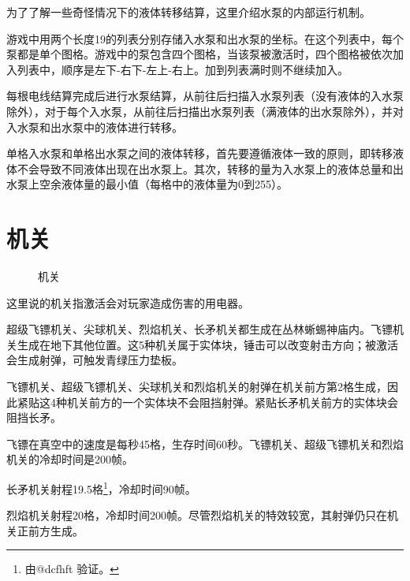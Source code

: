 为了了解一些奇怪情况下的液体转移结算，这里介绍水泵的内部运行机制。

游戏中用两个长度19的列表分别存储入水泵和出水泵的坐标。在这个列表中，每个泵都是单个图格。游戏中的泵包含四个图格，当该泵被激活时，四个图格被依次加入列表中，顺序是左下-右下-左上-右上。加到列表满时则不继续加入。

每根电线结算完成后进行水泵结算，从前往后扫描入水泵列表（没有液体的入水泵除外），对于每个入水泵，从前往后扫描出水泵列表（满液体的出水泵除外），并对入水泵和出水泵中的液体进行转移。

单格入水泵和单格出水泵之间的液体转移，首先要遵循液体一致的原则，即转移液体不会导致不同液体出现在出水泵上。其次，转移的量为入水泵上的液体总量和出水泵上空余液体量的最小值（每格中的液体量为0到255）。

\section{机关}
\begin{figure}[!ht]
\centering
{}\qquad
{}\qquad
{}\qquad
{}\qquad
{}\qquad
{}\qquad
{}\qquad
{}
\caption{机关}
\end{figure}
这里说的机关指激活会对玩家造成伤害的用电器。

超级飞镖机关、尖球机关、烈焰机关、长矛机关都生成在丛林蜥蜴神庙内。飞镖机关生成在地下其他位置。这5种机关属于实体块，锤击可以改变射击方向；被激活会生成射弹，可触发青绿压力垫板。

飞镖机关、超级飞镖机关、尖球机关和烈焰机关的射弹在机关前方第2格生成，因此紧贴这4种机关前方的一个实体块不会阻挡射弹。紧贴长矛机关前方的实体块会阻挡长矛。

飞镖在真空中的速度是每秒45格，生存时间60秒。飞镖机关、超级飞镖机关和烈焰机关的冷却时间是200帧。

长矛机关射程19.5格\footnote{由@dcfhft 验证。}，冷却时间90帧。

烈焰机关射程20格，冷却时间200帧。尽管烈焰机关的特效较宽，其射弹仍只在机关正前方生成。

